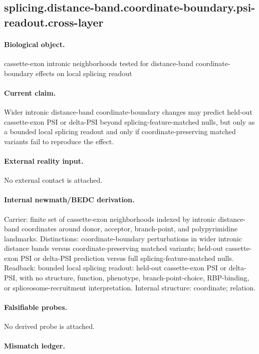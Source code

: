 \subsection{splicing.distance-band.coordinate-boundary.psi-readout.cross-layer}

\paragraph{Biological object.} cassette-exon intronic neighborhoods tested for distance-band coordinate-boundary effects on local splicing readout

\paragraph{Current claim.} Wider intronic distance-band coordinate-boundary changes may predict held-out cassette-exon PSI or delta-PSI beyond splicing-feature-matched nulls, but only as a bounded local splicing readout and only if coordinate-preserving matched variants fail to reproduce the effect.

\paragraph{External reality input.}
No external contact is attached.

\paragraph{Internal newmath/BEDC derivation.} Carrier: finite set of cassette-exon neighborhoods indexed by intronic distance-band coordinates around donor, acceptor, branch-point, and polypyrimidine landmarks. Distinctions: coordinate-boundary perturbations in wider intronic distance bands versus coordinate-preserving matched variants; held-out cassette-exon PSI or delta-PSI prediction versus full splicing-feature-matched nulls. Readback: bounded local splicing readout: held-out cassette-exon PSI or delta-PSI, with no structure, function, phenotype, branch-point-choice, RBP-binding, or spliceosome-recruitment interpretation. Internal structure: coordinate; relation.

\paragraph{Falsifiable probes.}
No derived probe is attached.

\paragraph{Mismatch ledger.}

